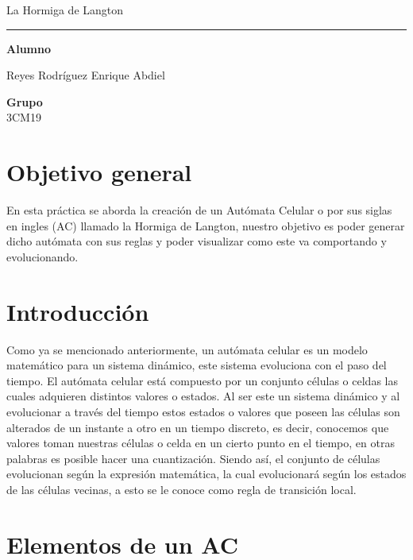 \documentclass[10pt]{article}
\newcommand{\HRule}{\textcolor{blueTitle}{\rule{\linewidth}{0.5mm}}}
\begin{document}
\begin{center}
{        La Hormiga de Langton}
        \HRule
        \vspace{1.5cm}

        \Large
        \textbf{Alumno} \\
        \vspace{.3cm}
       
        Reyes Rodríguez Enrique Abdiel\\
        \vspace{.3cm}
        \vspace{1cm}

        \Large
        \textbf{Grupo} \\
        \vspace{.3cm}
        3CM19
        \vspace{1cm}

    \end{center}
    
    \newpage
    \tableofcontents
    \newpage
    \section{Objetivo general}
        		En esta práctica se aborda la creación de un Autómata Celular o por sus siglas en ingles (AC) llamado la Hormiga de Langton, nuestro objetivo es poder generar dicho autómata con sus reglas y poder visualizar como este va comportando y evolucionando.

    \section{Introducción}
Como ya se mencionado anteriormente, un autómata celular es un modelo matemático para un sistema dinámico, este sistema evoluciona con el paso del tiempo. El autómata celular está compuesto por un conjunto células o celdas las cuales adquieren distintos valores o estados. Al ser este un sistema dinámico y al evolucionar a través del tiempo estos estados o valores que poseen las células son alterados de un instante a otro en un tiempo discreto, es decir, conocemos que valores toman nuestras células o celda en un cierto punto en el tiempo, en otras palabras es posible hacer una cuantización.
Siendo así, el conjunto de células evolucionan según la expresión matemática, la cual evolucionará según los estados de las células vecinas, a esto se le conoce como regla de transición local.

	\section{Elementos de un AC}
\end{document}
